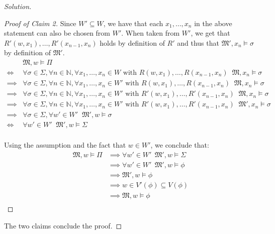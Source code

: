 \documentclass[12pt,a4paper]{report}
\theoremstyle{definition}
\newcommand{\N}{\mathbb{N}}                     %
\newcommand{\model}[1]{\mathfrak{#1}}           %
\begin{document}
\begin{proof}[Solution]
\begin{proof}[Proof of Claim 2]
            Since $W' \subseteq W$, we have that each $x_1, \ldots, x_n$ in the above statement can also be chosen from $W'$. When taken from $W'$, we get that $R'(w, x_1), \ldots, R'(x_{n-1}, x_n)$ holds by definition of $R'$ and thus that $\model M', x_n \models \sigma$ by definition of $\model M'$.
            \[\begin{split}
                & \model M, w \models \Pi \\
                \iff & \forall \sigma \in \Sigma, \forall n \in \N, \forall x_1, \ldots, x_n \in W  \text{ with } R(w, x_1), \ldots, R(x_{n-1}, x_n)\;\; \model M, x_n \models \sigma \\
                \implies & \forall \sigma \in \Sigma, \forall n \in \N, \forall x_1, \ldots, x_n \in W'  \text{ with } R(w, x_1), \ldots, R(x_{n-1}, x_n)\;\; \model M, x_n \models \sigma \\
                \implies & \forall \sigma \in \Sigma, \forall n \in \N, \forall x_1, \ldots, x_n \in W'  \text{ with } R'(w, x_1), \ldots, R'(x_{n-1}, x_n)\;\; \model M, x_n \models \sigma \\
                \implies & \forall \sigma \in \Sigma, \forall n \in \N, \forall x_1, \ldots, x_n \in W'  \text{ with } R'(w, x_1), \ldots, R'(x_{n-1}, x_n)\;\; \model M', x_n \models \sigma \\
                \implies & \forall \sigma \in \Sigma, \forall w' \in W' \;\; \model M', w \models \sigma \\
                \iff & \forall w' \in W' \;\; \model M', w \models \Sigma \\
            \end{split}\]

            Using the assumption and the fact that $w \in W'$, we conclude that:
            \[\begin{split}
                \model M, w \models \Pi &\implies \forall w' \in W' \,\; \model M', w \models \Sigma \\
                & \implies \forall w' \in W' \,\; \model M', w \models \phi \\
                & \implies \model M', w \models \phi \\
                & \implies w \in V'(\phi) \subseteq V(\phi)\\
                & \implies \model M, w \models \phi\\
            \end{split}\]
        \end{proof}

        The two claims conclude the proof.
    \end{proof}
\end{document}
